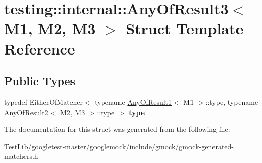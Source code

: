 \hypertarget{structtesting_1_1internal_1_1AnyOfResult3}{}\section{testing\+:\+:internal\+:\+:Any\+Of\+Result3$<$ M1, M2, M3 $>$ Struct Template Reference}
\label{structtesting_1_1internal_1_1AnyOfResult3}
\subsection*{Public Types}
\begin{DoxyCompactItemize}
\item 
\mbox{\label{structtesting_1_1internal_1_1AnyOfResult3_a232b20553cc0a33a6741e85e19ef4b0c}} 
typedef Either\+Of\+Matcher$<$ typename \hyperlink{structtesting_1_1internal_1_1AnyOfResult1}{Any\+Of\+Result1}$<$ M1 $>$\+::type, typename \hyperlink{structtesting_1_1internal_1_1AnyOfResult2}{Any\+Of\+Result2}$<$ M2, M3 $>$\+::type $>$ {\bfseries type}
\end{DoxyCompactItemize}


The documentation for this struct was generated from the following file\+:\begin{DoxyCompactItemize}
\item 
Test\+Lib/googletest-\/master/googlemock/include/gmock/gmock-\/generated-\/matchers.\+h\end{DoxyCompactItemize}
